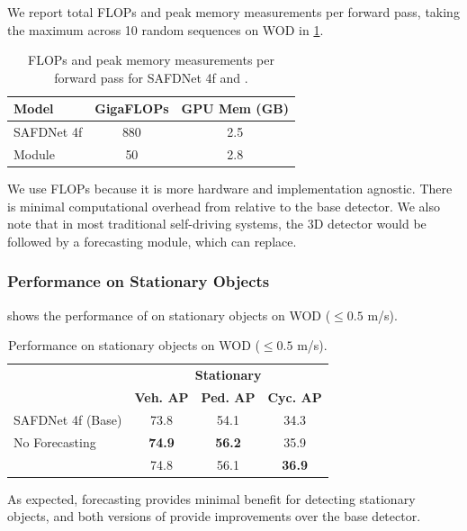 We report total FLOPs and peak memory measurements per forward pass,
taking the maximum across 10 random sequences on WOD in \cref{tab:flops}.
\begin{table}
    \begin{center}
    \footnotesize
    \begin{tabular}{lcc}
    \toprule
    \textbf{Model} & \textbf{GigaFLOPs} & \textbf{GPU Mem (GB)} \\
    \midrule
    SAFDNet 4f        & 880 & 2.5 \\
    \ourmodel{} Module        & 50  & 2.8 \\
    \bottomrule
    \end{tabular}
    \end{center}
    \caption{FLOPs and peak memory measurements per forward pass for SAFDNet 4f and \ourmodel{}.}
    \label{tab:flops}
\end{table}
We use FLOPs because it is more hardware and implementation agnostic.
There is minimal computational overhead from \ourmodel{} relative to the base detector.
We also note that in most traditional self-driving systems, the 3D detector would be followed by a forecasting module,
which \ourmodel{} can replace.

\subsubsection{Performance on Stationary Objects}

 shows the performance of \ourmodel{} on stationary objects on WOD ($\le 0.5$ m/s).
\begin{table}
\begin{center}
\footnotesize
\begin{tabular}{lccc}
\toprule
 & \multicolumn{3}{c}{\textbf{Stationary}} \\
 & \textbf{Veh. AP} & \textbf{Ped. AP} & \textbf{Cyc. AP} \\
\midrule
SAFDNet 4f (Base)          & 73.8 & 54.1 & 34.3 \\
\ourmodel{} No Forecasting & \textbf{74.9} & \textbf{56.2} & 35.9 \\
\ourmodel{}                & 74.8 & 56.1 & \textbf{36.9} \\
\bottomrule
\end{tabular}
\end{center}
\caption{Performance on stationary objects on WOD ($\le 0.5$ m/s).}
\label{fig:stationary-objects}
\end{table}
As expected, forecasting provides minimal benefit for detecting stationary objects, and both versions of \ourmodel{} provide improvements over the base detector.